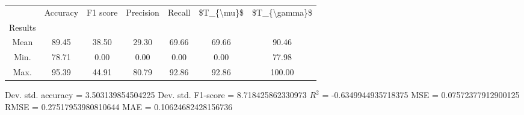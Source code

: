 \begin{tabular}{|c|c|c|c|c|c|c|}
\toprule
{} &  Accuracy &  F1 score &  Precision &  Recall &  \$T\_\{\textbackslash mu\}\$ &  \$T\_\{\textbackslash gamma\}\$ \\
Results &           &           &            &         &            &               \\
\hline
Mean    &     89.45 &     38.50 &      29.30 &   69.66 &      69.66 &         90.46 \\
Min.    &     78.71 &      0.00 &       0.00 &    0.00 &       0.00 &         77.98 \\
Max.    &     95.39 &     44.91 &      80.79 &   92.86 &      92.86 &        100.00 \\
\bottomrule
\end{tabular}

 Dev. std. accuracy = 3.503139854504225
 Dev. std. F1-score = 8.718425862330973
 $R^2$ = -0.6349944935718375
 MSE = 0.07572377912900125
 RMSE = 0.27517953980810644
 MAE = 0.10624682428156736